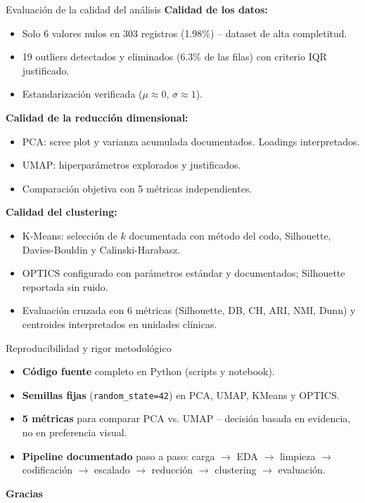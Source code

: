 \documentclass[10pt,aspectratio=169]{beamer}
\begin{document}
\begin{frame}{Evaluación de la calidad del análisis}
  \textbf{Calidad de los datos:}
  \begin{itemize}
    \item Solo 6 valores nulos en 303 registros (1.98\%) -- dataset de alta completitud.
    \item 19 outliers detectados y eliminados (6.3\% de las filas) con criterio IQR justificado.
    \item Estandarización verificada ($\mu \approx 0$, $\sigma \approx 1$).
  \end{itemize}

  \vspace{0.3cm}
  \textbf{Calidad de la reducción dimensional:}
  \begin{itemize}
    \item PCA: scree plot y varianza acumulada documentados. Loadings interpretados.
    \item UMAP: hiperparámetros explorados y justificados.
    \item Comparación objetiva con 5 métricas independientes.
  \end{itemize}

  \vspace{0.3cm}
  \textbf{Calidad del clustering:}
  \begin{itemize}
    \item K-Means: selección de $k$ documentada con método del codo, Silhouette, Davies-Bouldin y Calinski-Harabasz.
    \item OPTICS configurado con parámetros estándar y documentados; Silhouette reportada sin ruido.
    \item Evaluación cruzada con 6 métricas (Silhouette, DB, CH, ARI, NMI, Dunn) y centroides interpretados en unidades clínicas.
  \end{itemize}
\end{frame}

\begin{frame}{Reproducibilidad y rigor metodológico}
  \begin{itemize}
    \item \textbf{Código fuente} completo en Python (scripts y notebook).
    \item \textbf{Semillas fijas} (\texttt{random\_state=42}) en PCA, UMAP, KMeans y OPTICS.
    \item \textbf{5 métricas} para comparar PCA vs. UMAP -- decisión basada en evidencia, no en preferencia visual.
    \item \textbf{Pipeline documentado} paso a paso: carga $\rightarrow$ EDA $\rightarrow$ limpieza $\rightarrow$ codificación $\rightarrow$ escalado $\rightarrow$ reducción $\rightarrow$ clustering $\rightarrow$ evaluación.
  \end{itemize}

  \vspace{0.5cm}
  \begin{center}
    \Large \textbf{Gracias}
  \end{center}
\end{frame}
\end{document}
